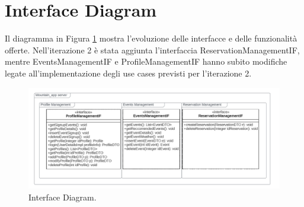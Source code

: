\section{Interface Diagram}
Il diagramma in Figura \ref*{fig:InterfaceDiagram} mostra l'evoluzione delle interfacce e delle funzionalità offerte.
Nell'iterazione 2 è stata aggiunta l'interfaccia ReservationManagementIF, mentre EventsManagementIF e ProfileManagementIF hanno subito
modifiche legate all'implementazione degli use cases previsti per l'iterazione 2.
\begin{figure}[h!]
	\centering
	\includegraphics[width=0.8\linewidth]{diagrams/Interface.drawio.png}
	\caption{Interface Diagram.}
	\label{fig:InterfaceDiagram}
\end{figure}